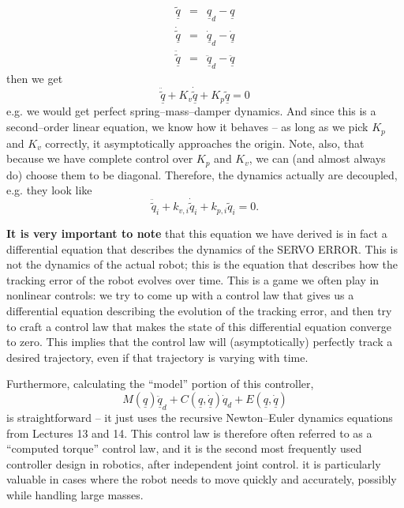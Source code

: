\documentclass[]{article}
\begin{document}
\begin{eqnarray}
 \underline{\tilde{q}} & = & \underline{q}_{d} - \underline{q} \nonumber\\
 \underline{\dot{\tilde{q}}} & = & \dot{\underline{q}}_{d} - \dot{\underline{q}} \nonumber \\
 \underline{\ddot{\tilde{q}}} & = & \ddot{\underline{q}}_{d} - \ddot{\underline{q}} 
\end{eqnarray}
then we get 
\begin{displaymath}
 \underline{\ddot{\tilde{q}}} + K_{v}\underline{\dot{\tilde{q}}} + K_{p}\underline{\tilde{q}} = 0 
 \end{displaymath}
 e.g. we would get perfect spring--mass--damper dynamics. And since this is a second--order linear equation, we know how it behaves -- as long as we pick $K_{p}$ and $K_{v}$ correctly, it asymptotically approaches the origin. Note, also, that because we have complete control over $K_{p}$ and $K_{v}$, we can (and almost always do) choose them to be diagonal. Therefore, the dynamics actually are decoupled, e.g. they look like
 \begin{displaymath}
  \ddot{\tilde{q}}_{i} + k_{v,i}\dot{\tilde{q}}_{i} + k_{p,i}\tilde{q}_{i} = 0.
 \end{displaymath}

 
 \textbf{It is very important to note} that this equation we have derived is in fact a differential equation that describes the dynamics of the SERVO ERROR. This is not the dynamics of the actual robot; this is the equation that describes how the tracking error of the robot evolves over time. This is a game we often play in nonlinear controls: we try to come up with a control law that gives us a differential equation describing the evolution of the tracking error, and then try to craft a control law that makes the state of this differential equation converge to zero. This implies that the control law will (asymptotically) perfectly track a desired trajectory, even if that trajectory is varying with time.
 
 Furthermore, calculating the ``model'' portion of this controller, 
 \begin{displaymath}
  M(\underline{q})\ddot{\underline{q}}_{d}  +C(\underline{q}, \underline{\dot{q}})\dot{q}_{d} + E(\underline{q}, \underline{\dot{q}}) 
 \end{displaymath}
is straightforward -- it just uses the recursive Newton--Euler dynamics equations from Lectures 13 and 14. This control law is therefore often referred to as a ``computed torque'' control law, and it is the second most frequently used controller design in robotics, after independent joint control. it is particularly valuable in cases where the robot needs to move quickly and accurately, possibly while handling large masses.
\end{document}
